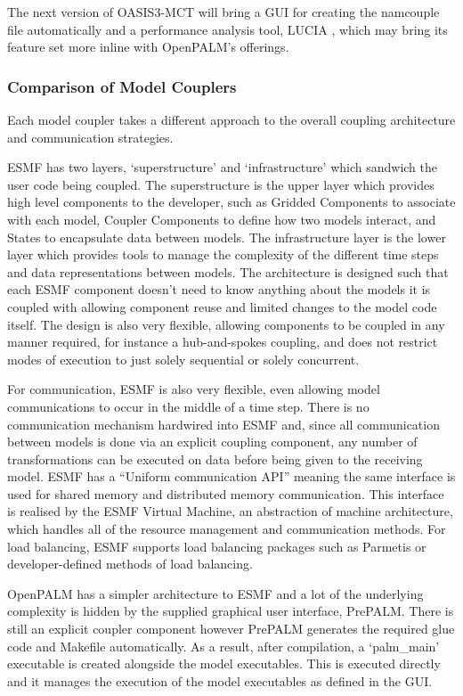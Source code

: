 \documentclass{acm_proc_article-sp}
\begin{document}
The next version of OASIS3-MCT will bring a GUI for creating the namcouple file
automatically and a performance analysis tool, LUCIA \cite{Maisonnave}, which
may bring its feature set more inline with OpenPALM's offerings.

\subsubsection*{Comparison of Model Couplers}

Each model coupler takes a different approach to the overall coupling
architecture and communication strategies.

ESMF has two layers, `superstructure' and `infrastructure' which sandwich the
user code being coupled. The superstructure is the upper layer which provides
high level components to the developer, such as Gridded Components to associate
with each model, Coupler Components to define how two models interact, and
States to encapsulate data between models. The infrastructure layer is the lower
layer which provides tools to manage the complexity of the different time steps
and data representations between models. The architecture is designed such that
each ESMF component doesn't need to know anything about the models it is coupled
with allowing component reuse and limited changes to the model code itself. The
design is also very flexible, allowing components to be coupled in any manner
required, for instance a hub-and-spokes coupling, and does not restrict modes of
execution to just solely sequential or solely concurrent.

For communication, ESMF is also very flexible, even allowing model
communications to occur in the middle of a time step. There is no communication
mechanism hardwired into ESMF and, since all communication between models is
done via an explicit coupling component, any number of transformations can be
executed on data before being given to the receiving model. ESMF has a ``Uniform
communication API'' \cite{ESMF2014} meaning the same interface is used for
shared memory and distributed memory communication. This interface is realised
by the ESMF Virtual Machine, an abstraction of machine architecture, which
handles all of the resource management and communication methods. For load
balancing, ESMF supports load balancing packages such as Parmetis
\cite{Hoefler2010,Karypis1998} or developer-defined methods of load balancing.

OpenPALM has a simpler architecture to ESMF and a lot of the underlying
complexity is hidden by the supplied graphical user interface, PrePALM. There is
still an explicit coupler component however PrePALM generates the required glue
code and Makefile automatically. As a result, after compilation, a `palm\_main'
executable is created alongside the model executables. This is executed directly
and it manages the execution of the model executables as defined in the GUI.
\end{document}
